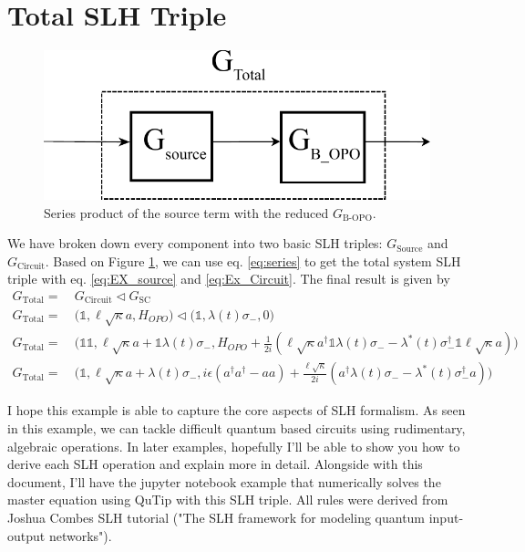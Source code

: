 \documentclass[a4paper]{article}
\begin{document}
\section*{Total SLH Triple}

\begin{figure}[H]
\centering
\includegraphics[width = 9 cm]{Example_Sourced_feedback_final.pdf}
\caption{Series product of the source term with the reduced $G_{\text{B-OPO}}$.
}
\label{fig:Final_connection}
\end{figure}  

We have broken down every component into two basic SLH triples: $G_{\text{Source}}$ and $G_{\text{Circuit}}$. Based on Figure \ref{fig:Final_connection}, we can use eq. \ref{eq:series} to get the total system SLH triple with eq. \ref{eq:EX_source} and \ref{eq:Ex_Circuit}. The final result is given by 
\begin{align*}
    G_{\text{Total}} = & \ G_{\text{Circuit}} \triangleleft G_{\text{SC}} \\
    G_{\text{Total}} = & \ \Bigg( \mathbb{1}, \ell \sqrt{\kappa}a ,H_{OPO}\Bigg) \triangleleft \Bigg( \mathbb{1}, \lambda(t)\sigma_-, 0 \Bigg) \\ 
    G_{\text{Total}} = & \ \Bigg( \mathbb{1}\mathbb{1}, \ell \sqrt{\kappa}a +  \mathbb{1} \lambda(t)\sigma_-,H_{OPO} + \frac{1}{2i}(\ell \sqrt{\kappa}a^\dagger \mathbb{1}  \lambda(t)\sigma_- - \lambda^*(t)\sigma_-^\dagger \mathbb{1}  \ell \sqrt{\kappa}a) \Bigg)
\end{align*}
\begin{align}
    G_{\text{Total}} = & \ \Bigg( \mathbb{1}, \ell \sqrt{\kappa}a + \lambda(t)\sigma_-, i\epsilon(a^\dagger a^\dagger - a a) + \frac{\ell \sqrt{\kappa}}{2i}(a^\dagger \lambda(t)\sigma_- - \lambda^*(t)\sigma_-^\dagger a) \Bigg)
    \label{eq:EX_FINAL_RESULT}
\end{align}

I hope this example is able to capture the core aspects of SLH formalism. As seen in this example, we can tackle difficult quantum based circuits using rudimentary, algebraic operations. In later examples, hopefully I'll be able to show you how to derive each SLH operation and explain more in detail. Alongside with this document, I'll have the jupyter notebook example that numerically solves the master equation using QuTip with this SLH triple. All rules were derived from Joshua Combes SLH tutorial ("The SLH framework for modeling quantum input-output networks"). 
\end{document}
